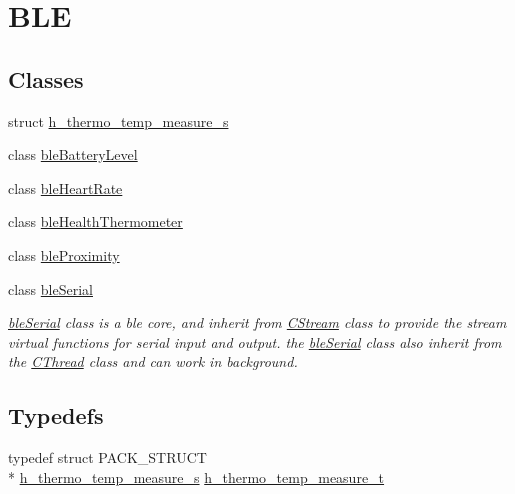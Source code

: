 \hypertarget{group___b_l_e}{\section{B\-L\-E}
\label{group___b_l_e}
}
\subsection*{Classes}
\begin{DoxyCompactItemize}
\item 
struct \hyperlink{structh__thermo__temp__measure__s}{h\-\_\-thermo\-\_\-temp\-\_\-measure\-\_\-s}
\item 
class \hyperlink{classble_battery_level}{ble\-Battery\-Level}
\item 
class \hyperlink{classble_heart_rate}{ble\-Heart\-Rate}
\item 
class \hyperlink{classble_health_thermometer}{ble\-Health\-Thermometer}
\item 
class \hyperlink{classble_proximity}{ble\-Proximity}
\item 
class \hyperlink{classble_serial}{ble\-Serial}
\begin{DoxyCompactList}\small\item\em \hyperlink{classble_serial}{ble\-Serial} class is a ble core, and inherit from \hyperlink{class_c_stream}{C\-Stream} class to provide the stream virtual functions for serial input and output. the \hyperlink{classble_serial}{ble\-Serial} class also inherit from the \hyperlink{class_c_thread}{C\-Thread} class and can work in background. \end{DoxyCompactList}\end{DoxyCompactItemize}
\subsection*{Typedefs}
\begin{DoxyCompactItemize}
\item 
typedef struct P\-A\-C\-K\-\_\-\-S\-T\-R\-U\-C\-T \\*
\hyperlink{structh__thermo__temp__measure__s}{h\-\_\-thermo\-\_\-temp\-\_\-measure\-\_\-s} \hyperlink{group___b_l_e_ga29b646d2e9db814fb80f36bfeeec82d1}{h\-\_\-thermo\-\_\-temp\-\_\-measure\-\_\-t}
\end{DoxyCompactItemize}
